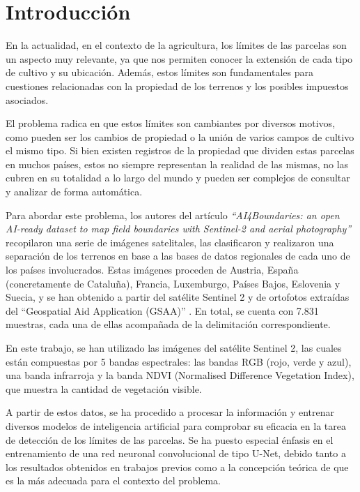 \chapter{Introducción}

En la actualidad, en el contexto de la agricultura, los límites de las parcelas son un aspecto muy relevante, ya que nos permiten conocer la extensión de cada tipo de cultivo y su ubicación. Además, estos límites son fundamentales para cuestiones relacionadas con la propiedad de los terrenos y los posibles impuestos asociados.

El problema radica en que estos límites son cambiantes por diversos motivos, como pueden ser los cambios de propiedad o la unión de varios campos de cultivo el mismo tipo. Si bien existen registros de la propiedad que dividen estas parcelas en muchos países, estos no siempre representan la realidad de las mismas, no las cubren en su totalidad a lo largo del mundo y pueden ser complejos de consultar y analizar de forma automática.

Para abordar este problema, los autores del artículo \textit{``AI4Boundaries: an open AI-ready dataset to map field boundaries with Sentinel-2 and aerial photography''} \cite{AI4boundaries} recopilaron una serie de imágenes satelitales, las clasificaron y realizaron una separación de los terrenos en base a las bases de datos regionales de cada uno de los países involucrados. Estas imágenes proceden de Austria, España (concretamente de Cataluña), Francia, Luxemburgo, Países Bajos, Eslovenia y Suecia, y se han obtenido a partir del satélite Sentinel 2 \cite{copernicusSentinel2} y de ortofotos extraídas del ``Geospatial Aid Application (GSAA)'' \cite{eurodatacube}. En total, se cuenta con 7.831 muestras, cada una de ellas acompañada de la delimitación correspondiente.

En este trabajo, se han utilizado las imágenes del satélite Sentinel 2, las cuales están compuestas por 5 bandas espectrales: las bandas RGB (rojo, verde y azul), una banda infrarroja y la banda NDVI (Normalised Difference Vegetation Index), que muestra la cantidad de vegetación visible.

A partir de estos datos, se ha procedido a procesar la información y entrenar diversos modelos de inteligencia artificial para comprobar su eficacia en la tarea de detección de los límites de las parcelas. Se ha puesto especial énfasis en el entrenamiento de una red neuronal convolucional de tipo U-Net, debido tanto a los resultados obtenidos en trabajos previos como a la concepción teórica de que es la más adecuada para el contexto del problema.

